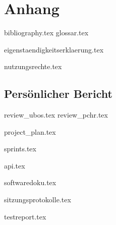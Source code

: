 \part*{Anhang}

\begin{comment}
In den Anhang gehört: Formulare (z.B. Eigenständigkeitserklärung, Nutzungsrechte, ...), Persönliche Reflektion, Projektplanung inkl. Risiko-Listen (Dokumentation der Versionen nach jeder Iteration), Zeitabrechnung nach sinnvollen Kategorien, Sitzungsprotokolle - das sind alles HSR-internen, nicht publizierte Dokumentationselemente (Abgabe nur für die Bewertung und Archivierung, in einer PDF-Datei)
\end{comment}

{bibliography.tex}
{glossar.tex}

{eigenstaendigkeitserklaerung.tex}

{nutzungsrechte.tex}

\chapter{Persönlicher Bericht}
{review_ubos.tex}
{review_pchr.tex}

{project_plan.tex}

{sprints.tex}

{api.tex}

{softwaredoku.tex}

{sitzungsprotokolle.tex}

{testreport.tex}